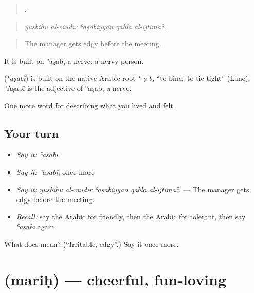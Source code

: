 \begin{quote}
    .
\end{quote}

\begin{quote}
\emph{yuṣbiḥu al-mudīr ʿaṣabiyyan qabla al-ijtimāʿ.}
\end{quote}

\begin{quote}
The manager gets edgy before the meeting.
\end{quote}

It is built on ʿaṣab, a nerve: a nervy person.

\begin{cousinweb}
\textbf{} (\emph{ʿaṣabī}) is built on the native Arabic root \emph{ʿ-ṣ-b}, \textquotedblleft{}to bind, to tie tight\textquotedblright{} (Lane). ʿAṣabī is the adjective of ʿaṣab, a nerve.
\end{cousinweb}

\begin{grammarlens}[title={What you've built}]
One more word for describing what you lived and felt.
\end{grammarlens}

\subsection*{Your turn}
\begin{itemize}
\raggedright
  \item \emph{Say it:} \emph{ʿaṣabī}
  \item \emph{Say it:} \emph{ʿaṣabī}, once more
  \item \emph{Say it:} \emph{yuṣbiḥu al-mudīr ʿaṣabiyyan qabla al-ijtimāʿ.} — The manager gets edgy before the meeting.
  \item \emph{Recall:} say the Arabic for friendly, then the Arabic for tolerant, then say \emph{ʿaṣabī} again
\end{itemize}

\begin{tcolorbox}[breakable,colback=teal!4,colframe=teal!35!black,title={Before you move on}]
What does  mean? (\textquotedblleft{}Irritable, edgy\textquotedblright{}.) Say it once more.
\end{tcolorbox}
\section[\texorpdfstring{\ar{مرح} (mariḥ)}{مرح (mariḥ)}]{ (mariḥ) — cheerful, fun-loving}

